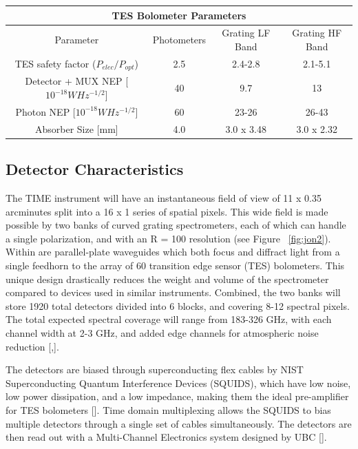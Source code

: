 \documentclass[manuscript]{aastex}
\begin{document}
\begin{center}
    \begin{tabular}{|c|c|c|c|}
    \hline
    \multicolumn{4}{|c|}{TES Bolometer Parameters} \\
    \hline
    \hline
    Parameter & Photometers & Grating LF Band & Grating HF Band \\
    \hline
    TES safety factor ($P_{elec}/P_{opt}$) & 2.5 & 2.4-2.8 & 2.1-5.1 \\
    Detector + MUX NEP [$10^{-18} W Hz^{-1/2}$] & 40 & 9.7 & 13 \\
    Photon NEP [$10^{-18} W Hz^{-1/2}$] & 60 & 23-26 & 26-43 \\
    Absorber Size [mm] & 4.0 & 3.0 x 3.48 & 3.0 x 2.32 \\
    \hline 
    \end{tabular}
\end{center}
\subsection{Detector Characteristics}

The TIME instrument will have an instantaneous field of view of 11 x 0.35 arcminutes split into a 16 x 1 series of spatial pixels. This wide field is made possible by two banks of curved grating spectrometers, each of which can handle a single polarization, and with an R = 100 resolution (see Figure ~\ref{fig:jon2}). Within are parallel-plate waveguides which both focus and diffract light from a single feedhorn to the array of 60 transition edge sensor (TES) bolometers. This unique design drastically reduces the weight and volume of the spectrometer compared to devices used in similar instruments. Combined, the two banks will store 1920 total detectors divided into 6 blocks, and covering 8-12 spectral pixels. The total expected spectral coverage will range from 183-326 GHz, with each channel width at 2-3 GHz, and added edge channels for atmospheric noise reduction [\cite{Crites2014},\cite{Hunacek2016}].

The detectors are biased through superconducting flex cables by NIST Superconducting Quantum Interference Devices (SQUIDS), which have low noise, low power dissipation, and a low impedance, making them the ideal pre-amplifier for TES bolometers [\cite{Dobbs2009}]. Time domain multiplexing allows the SQUIDS to bias multiple detectors through a single set of cables simultaneously. The detectors are then read out with a Multi-Channel Electronics system designed by UBC [\cite{Battistelli2008}].
\end{document}
